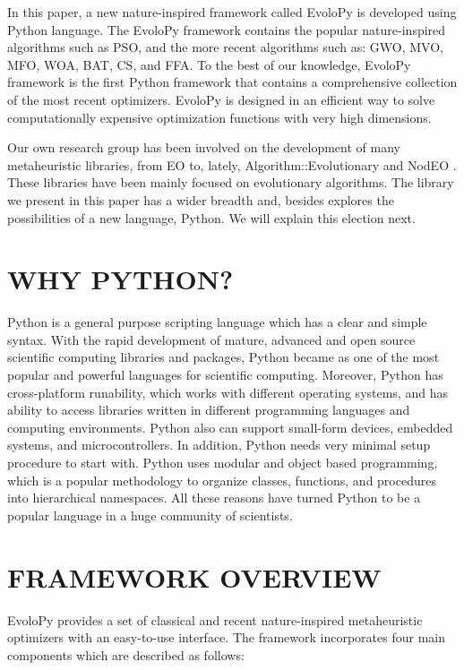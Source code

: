 \documentclass[a4paper,twoside]{article}
\begin{document}
In this paper, a new nature-inspired framework called EvoloPy is developed using Python language. The EvoloPy framework contains the popular nature-inspired algorithms such as PSO, and the more recent algorithms such as: GWO, MVO, MFO, WOA, BAT, CS, and FFA. To the best of our knowledge, EvoloPy framework is the first Python framework that contains a comprehensive collection of the most recent optimizers. EvoloPy is designed in an efficient way to solve computationally expensive optimization functions with very high dimensions. 

Our own research group has been involved on the development of many
metaheuristic libraries, from EO \cite{EO:FEA2000} to, lately, {\sf
  Algorithm::Evolutionary} \cite{ae09} and NodEO
\cite{nodeo2014}. These libraries have been mainly focused on
evolutionary algorithms. The library we present in this paper has a
wider breadth and, besides explores the possibilities of a new
language, Python. We will explain this election next. 


\section{\uppercase{Why Python?}}

Python is a general purpose scripting language which has a clear and simple syntax. With the rapid development of mature, advanced  and open source scientific computing libraries and packages, Python became as one of the most popular and powerful languages for scientific computing.
Moreover, Python has cross-platform runability, which works with different operating systems, and has ability to access libraries written in different programming languages and computing environments. Python also can support small-form devices, embedded systems, and microcontrollers. In addition, Python needs very minimal setup procedure to start with. Python uses modular and object based programming, which is a popular methodology to organize classes, functions, and procedures into hierarchical namespaces. All these reasons have turned Python to be a popular language in a huge community of scientists. 

\section{\uppercase{Framework Overview}}

EvoloPy provides a set of classical and recent nature-inspired metaheuristic optimizers with an easy-to-use interface. The framework incorporates four main components which are described as follows: 
\end{document}

